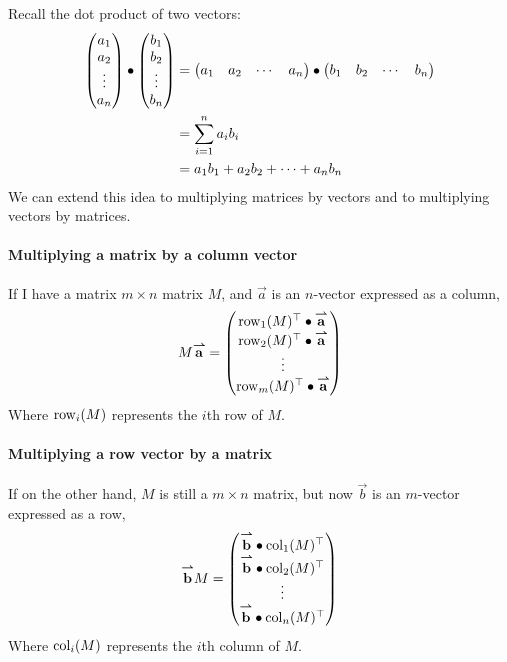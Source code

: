 \documentclass{ximera}
\begin{document}
Recall the dot product of two vectors:
\begin{align*}
  \begin{pmatrix}
    a_1\\
    a_2\\
    \vdots\\
    a_n
  \end{pmatrix}
  \bullet
  \begin{pmatrix}
    b_1\\
    b_2\\
    \vdots\\
    b_n
  \end{pmatrix}
  &=\begin{pmatrix} a_1 & a_2 & \cdots & a_n\end{pmatrix}\bullet\begin{pmatrix} b_1 & b_2 & \cdots & b_n\end{pmatrix}\\
  &= \sum_{i=1}^n a_ib_i\\
  &= a_1b_1 + a_2b_2 +\dots+a_nb_n
\end{align*}
We can extend this idea to multiplying matrices by vectors and to
multiplying vectors by matrices.

\paragraph{Multiplying a matrix by a column vector}

If I have a matrix $m\times n$ matrix $M$, and $\vec{a}$ is an
$n$-vector expressed as a column,
\[
M {\overset{\boldsymbol{\rightharpoonup}}{\mathbf{a}}}\hspace{0in} =
\begin{pmatrix}
  \operatorname{row}_1(M)^\top \bullet {\overset{\boldsymbol{\rightharpoonup}}{\mathbf{a}}}\hspace{0in} \\
  \operatorname{row}_2(M)^\top \bullet {\overset{\boldsymbol{\rightharpoonup}}{\mathbf{a}}}\hspace{0in} \\
  \vdots \\
  \operatorname{row}_m(M)^\top \bullet {\overset{\boldsymbol{\rightharpoonup}}{\mathbf{a}}}\hspace{0in}
\end{pmatrix}
\]
Where $\operatorname{row}_i(M)$ represents the $i$th row of $M$.

\paragraph{Multiplying a row vector by a matrix}
If on the other hand, $M$ is still a $m\times n$ matrix, but now
$\vec{b}$ is an $m$-vector expressed as a row,
\[
{\overset{\boldsymbol{\rightharpoonup}}{\mathbf{b}}}\hspace{0in} M =
\begin{pmatrix}
  {\overset{\boldsymbol{\rightharpoonup}}{\mathbf{b}}}\hspace{0in}\bullet \operatorname{col}_1(M)^\top \\
  {\overset{\boldsymbol{\rightharpoonup}}{\mathbf{b}}}\hspace{0in}\bullet \operatorname{col}_2(M)^\top \\
  \vdots \\
  {\overset{\boldsymbol{\rightharpoonup}}{\mathbf{b}}}\hspace{0in}\bullet \operatorname{col}_n(M)^\top
\end{pmatrix}
\]
Where $\operatorname{col}_i(M)$ represents the $i$th column of $M$.
\end{document}
